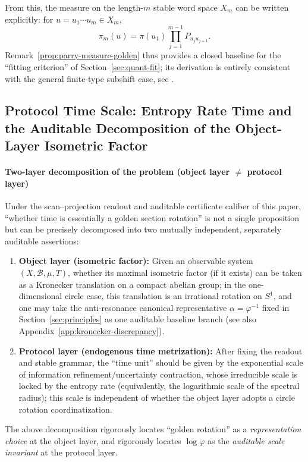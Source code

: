 From this, the measure on the length-$m$ stable word space $X_m$ can be written explicitly: for $u=u_1\cdots u_m\in X_m$,
\[
\pi_m(u)=\pi(u_1)\prod_{j=1}^{m-1} P_{u_j u_{j+1}}.
\]
Remark~\ref{prop:parry-measure-golden} thus provides a closed baseline for the ``fitting criterion'' of Section~\ref{sec:quant-fit}; its derivation is entirely consistent with the general finite-type subshift case, see \cite{LindMarcus1995}.

\subsection{Protocol Time Scale: Entropy Rate Time and the Auditable Decomposition of the Object-Layer Isometric Factor}\label{subsec:time-protocol-entropy-vs-rotation}
\paragraph{Two-layer decomposition of the problem (object layer \texorpdfstring{$\neq$}{/=} protocol layer)}
Under the scan--projection readout and auditable certificate caliber of this paper, ``whether time is essentially a golden section rotation'' is not a single proposition but can be precisely decomposed into two mutually independent, separately auditable assertions:
\begin{enumerate}
  \item \textbf{Object layer (isometric factor):} Given an observable system \((X,\mathcal{B},\mu,T)\), whether its maximal isometric factor (if it exists) can be taken as a Kronecker translation on a compact abelian group; in the one-dimensional circle case, this translation is an irrational rotation on \(S^1\), and one may take the anti-resonance canonical representative \(\alpha=\varphi^{-1}\) fixed in Section~\ref{sec:principles} as one auditable baseline branch (see also Appendix~\ref{app:kronecker-discrepancy}).
  \item \textbf{Protocol layer (endogenous time metrization):} After fixing the readout and stable grammar, the ``time unit'' should be given by the exponential scale of information refinement/uncertainty contraction, whose irreducible scale is locked by the entropy rate (equivalently, the logarithmic scale of the spectral radius); this scale is independent of whether the object layer adopts a circle rotation coordinatization.
\end{enumerate}
The above decomposition rigorously locates ``golden rotation'' as a \emph{representation choice} at the object layer, and rigorously locates \(\log\varphi\) as the \emph{auditable scale invariant} at the protocol layer.
\par

